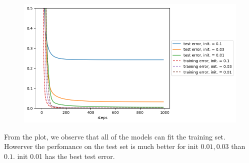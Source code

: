 
\begin{answer}
\newpage
\begin{figure}[H]
    \centering
    \includegraphics[width = 13cm]{implicitreg/implicitreg_quadratic_initialization.png}
\end{figure}
From the plot, we observe that all of the models can fit the training set. Howerver the perfomance on the test set is much better for init $0.01, 0.03$ than $0.1$. init 0.01 has the best test error.
\end{answer}